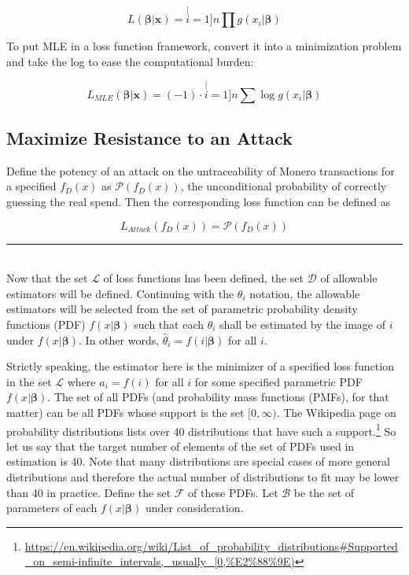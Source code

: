 \documentclass[english]{article}
\begin{document}
\[
L\left(\boldsymbol{\beta}|\mathbf{x}\right)=\stackrel[i=1]{n}{\prod}g\left(x_{i}|\boldsymbol{\beta}\right)
\]

To put MLE in a loss function framework, convert it into a minimization
problem and take the log to ease the computational burden:

\begin{equation}
L_{MLE}\left(\boldsymbol{\beta}|\mathbf{x}\right)=\left(-1\right)\cdot\stackrel[i=1]{n}{\sum}\log g\left(x_{i}|\boldsymbol{\beta}\right)\label{eq:L-MLE}
\end{equation}


\subsection{Maximize Resistance to an Attack\label{subsec:Maximize-Resistance-to-an-Attack}}

Define the potency of an attack on the untraceability of Monero transactions
for a specified $f_{D}(x)$ as $\mathscr{P}\left(f_{D}(x)\right)$,
the unconditional probability of correctly guessing the real spend.
Then the corresponding loss function can be defined as

\begin{equation}
L_{Attack}\left(f_{D}(x)\right)=\mathscr{P}\left(f_{D}(x)\right)\label{eq:L-Attack}
\end{equation}

\par\noindent\rule{\textwidth}{0.4pt}\\

Now that the set $\mathcal{L}$ of loss functions has been defined,
the set $\mathcal{D}$ of allowable estimators will be defined. Continuing
with the $\theta_{i}$ notation, the allowable estimators will be
selected from the set of parametric probability density functions
(PDF) $f\left(x|\boldsymbol{\beta}\right)$ such that each $\theta_{i}$
shall be estimated by the image of $i$ under $f\left(x|\boldsymbol{\beta}\right)$.
In other words, $\hat{\theta}_{i}=f\left(i|\boldsymbol{\beta}\right)$
for all $i$.

Strictly speaking, the estimator here is the minimizer of a specified
loss function in the set $\mathcal{L}$ where $a_{i}=f(i)$ for all
$i$ for some specified parametric PDF $f\left(x|\boldsymbol{\beta}\right)$.
The set of all PDFs (and probability mass functions (PMFs), for that
matter) can be all PDFs whose support is the set $[0,\infty)$. The
Wikipedia page on probability distributions lists over 40 distributions
that have such a support.\footnote{\href{https://en.wikipedia.org/wiki/List_of_probability_distributions\#Supported_on_semi-infinite_intervals,_usually_[0,\%E2\%88\%9E)}{https://en.wikipedia.org/wiki/List\_of\_probability\_distributions\#Supported\_on\_semi-infinite\_intervals,\_usually\_[0,\%E2\%88\%9E)}}
So let us say that the target number of elements of the set of PDFs
used in estimation is 40. Note that many distributions are special
cases of more general distributions and therefore the actual number
of distributions to fit may be lower than 40 in practice. Define the
set $\mathcal{F}$ of these PDFs. Let $\mathcal{B}$ be the set of
parameters of each $f\left(x|\boldsymbol{\beta}\right)$ under consideration.
\end{document}
